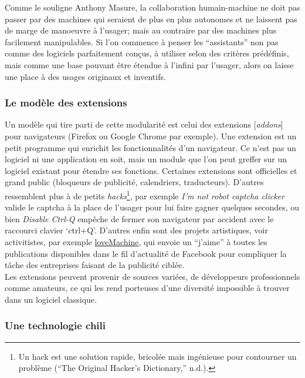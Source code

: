\documentclass[]{article}
\begin{document}
Comme le souligne Anthony Masure, la collaboration humain-machine ne
doit pas passer par des machines qui seraient de plus en plus autonomes
et ne laissent pas de marge de manoeuvre à l'usager; mais au contraire
par des machines plus facilement manipulables. Si l'on commence à penser
les ``assistants'' non pas comme des logiciels parfaitement conçus, à
utiliser selon des critères prédéfinis, mais comme une base pouvant être
étendue à l'infini par l'usager, alors on laisse une place à des usages
originaux et inventifs.

\hypertarget{le-moduxe8le-des-extensions}{%
\subsubsection{Le modèle des
extensions}\label{le-moduxe8le-des-extensions}}

Un modèle qui tire parti de cette modularité est celui des extensions
{[}\emph{addons}{]} pour navigateurs (Firefox ou Google Chrome par
exemple). Une extension est un petit programme qui enrichit les
fonctionnalités d'un navigateur. Ce n'est pas un logiciel ni une
application en soit, mais un module que l'on peut greffer sur un
logiciel existant pour étendre ses fonctions. Certaines extensions sont
officielles et grand public (bloqueurs de publicité, calendriers,
traducteurs). D'autres ressemblent plus à de petits
\emph{hacks}\footnote{Un hack est une solution rapide, bricolée mais
  ingénieuse pour contourner un problème (``The Original Hacker's
  Dictionary,'' n.d.).}, par exemple \emph{I'm not robot captcha
clicker} valide le captcha à la place de l'usager pour lui faire gagner
quelques secondes, ou bien \emph{Disable Ctrl-Q} empêche de fermer son
navigateur par accident avec le raccourci clavier `ctrl+Q'. D'autres
enfin sont des projets artistiques, voir activitistes, par exemple
\href{http://lovemachine.cc/}{loveMachine}, qui envoie un ``j'aime'' à
toutes les publications disponibles dans le fil d'actualité de Facebook
pour compliquer la tâche des entreprises faisant de la publicité
ciblée.\\
Les extensions peuvent provenir de sources variées, de développeurs
professionnels comme amateurs, ce qui les rend porteuses d'une diversité
impossible à trouver dans un logiciel classique.

\hypertarget{une-technologie-chili}{%
\subsubsection{Une technologie chili}\label{une-technologie-chili}}
\end{document}
